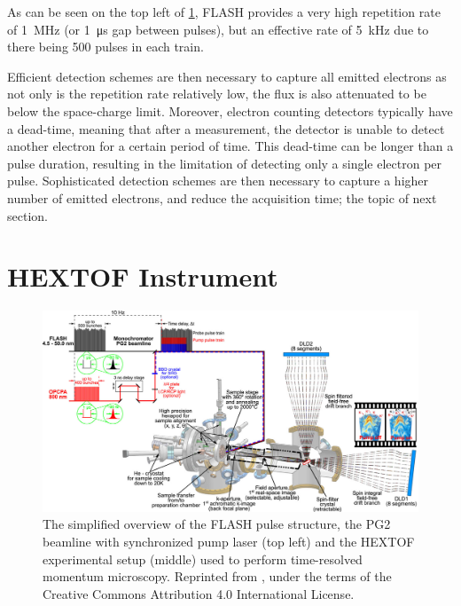 As can be seen on the top left of \cref{fig:hex-tof}, \gls{FLASH} provides a very high repetition rate of \qty{1}{\mega\hertz} (or \qty{1}{\micro\second} gap between \glspl{pulse}), but an effective rate of \qty{5}{\kilo\hertz} due to there being \num{500} pulses in each \gls{train}. 

Efficient detection schemes are then necessary to capture all emitted electrons as not only is the repetition rate relatively low, the flux is also attenuated to be below the space-charge limit. Moreover, electron counting detectors typically have a dead-time, meaning that after a measurement, the detector is unable to detect another electron for a certain period of time. This dead-time can be longer than a pulse duration, resulting in the limitation of detecting only a single electron per pulse. Sophisticated detection schemes are then necessary to capture a higher number of emitted electrons, and reduce the acquisition time; the topic of next section.

\section{HEXTOF Instrument}\label{section:hextof}

\begin{figure}
    \centering
    \includegraphics[width=1\linewidth]{images/2024-08-27-10-50-01.png}
    \caption{The simplified overview of the \gls{FLASH} pulse structure, the PG2 beamline with synchronized pump laser (top left) and the \gls{HEXTOF} experimental setup (middle) used to perform time-resolved momentum microscopy.
    Reprinted from \cite{kutnyakhovTimeMomentumresolvedPhotoemission2020}, under the terms of the Creative Commons Attribution 4.0 International License.}
    \label{fig:hex-tof}
\end{figure}

